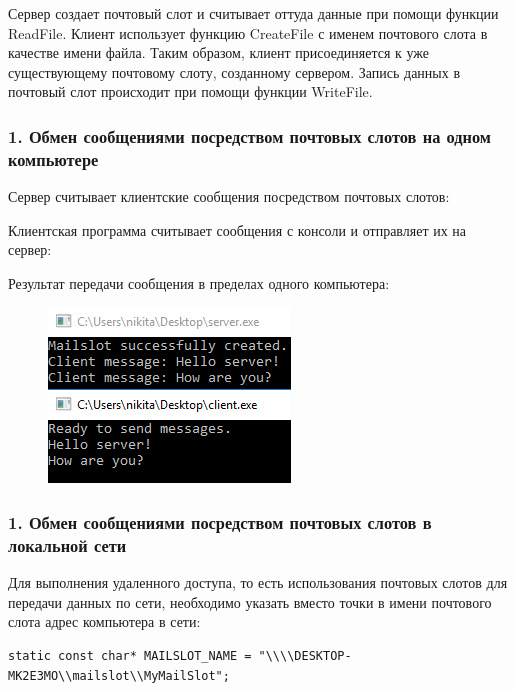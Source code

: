 \documentclass[14pt,a4paper,report]{report}
\begin{document}
Сервер создает почтовый слот и считывает оттуда данные при помощи функции ReadFile. Клиент использует функцию CreateFile с именем почтового слота в качестве имени файла. Таким образом, клиент присоединяется к уже существующему почтовому слоту, созданному сервером. Запись данных в почтовый слот происходит при помощи функции WriteFile.

\subsubsection{1. Обмен сообщениями посредством почтовых слотов на одном компьютере}

Сервер считывает клиентские сообщения посредством почтовых слотов:



Клиентская программа считывает сообщения с консоли и отправляет их на сервер:



Результат передачи сообщения в пределах одного компьютера:

\begin{figure}[h!]
	\centering
	\includegraphics[scale = 0.9]{images/p6_1.png}
	
	\caption{}
	\label{image:26}
\end{figure}

\subsubsection{1. Обмен сообщениями посредством почтовых слотов в локальной сети}

Для выполнения удаленного доступа, то есть использования почтовых слотов для передачи данных по сети, необходимо указать вместо точки в имени почтового слота адрес компьютера в сети:

\begin{verbatim}
static const char* MAILSLOT_NAME = "\\\\DESKTOP-MK2E3MO\\mailslot\\MyMailSlot";
\end{verbatim}
\end{document}
